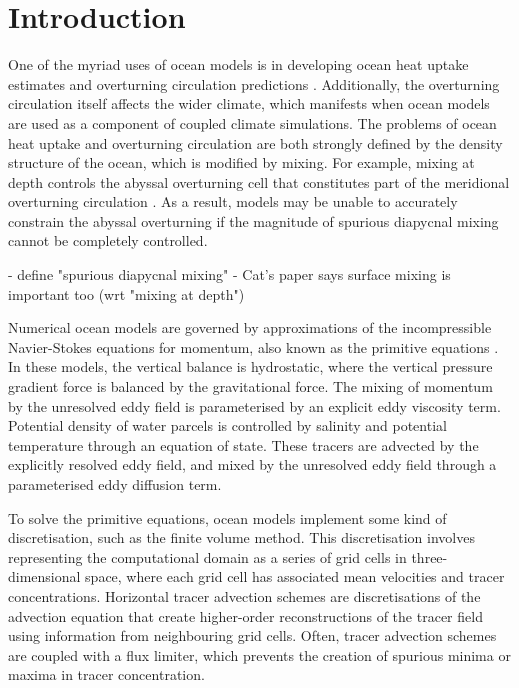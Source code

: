 \section{Introduction}

One of the myriad uses of ocean models is in developing ocean heat uptake estimates and overturning circulation predictions \citep{armour16}. Additionally, the overturning circulation itself affects the wider climate, which manifests when ocean models are used as a component of coupled climate simulations. The problems of ocean heat uptake and overturning circulation are both strongly defined by the density structure of the ocean, which is modified by mixing. For example, mixing at depth controls the abyssal overturning cell that constitutes part of the meridional overturning circulation \citep{mashayek15}. As a result, models may be unable to accurately constrain the abyssal overturning if the magnitude of spurious diapycnal mixing cannot be completely controlled.

- define "spurious diapycnal mixing"
- Cat's paper says surface mixing is important too (wrt "mixing at depth")

Numerical ocean models are governed by approximations of the incompressible Navier-Stokes equations for momentum, also known as the primitive equations \citep{griffies04}. In these models, the vertical balance is hydrostatic, where the vertical pressure gradient force is balanced by the gravitational force. The mixing of momentum by the unresolved eddy field is parameterised by an explicit eddy viscosity term. Potential density of water parcels is controlled by salinity and potential temperature through an equation of state. These tracers are advected by the explicitly resolved eddy field, and mixed by the unresolved eddy field through a parameterised eddy diffusion term.

To solve the primitive equations, ocean models implement some kind of discretisation, such as the finite volume method. This discretisation involves representing the computational domain as a series of grid cells in three-dimensional space, where each grid cell has associated mean velocities and tracer concentrations. Horizontal tracer advection schemes are discretisations of the advection equation that create higher-order reconstructions of the tracer field using information from neighbouring grid cells. Often, tracer advection schemes are coupled with a flux limiter, which prevents the creation of spurious minima or maxima in tracer concentration.

